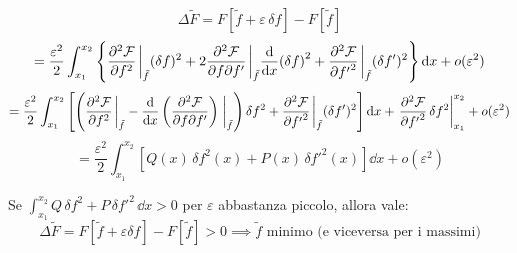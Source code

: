 \begin{equation*}
    \Delta \tilde{F} = F\left[ \tilde{f} + \varepsilon \, \delta f \right] - F[\tilde{f}]   
\end{equation*}
\begin{equation*}
    = \frac{\varepsilon^2}{2} \int_{x_1}^{x_2} \left\{
    \pdv[2]{\mathcal{F}}{f}\eval_{\tilde{f}} (\delta f)^2 
    + 2 \pdv[2]{\mathcal{F}}{f}{{f'}}\eval_{\tilde{f}} \dv{x}(\delta f)^2 
    + \pdv[2]{\mathcal{F}}{{f'}}\eval_{\tilde{f}} (\delta f')^2 
    \right\} \dd{x} + o(\varepsilon^2)
\end{equation*}
\begin{equation*}
    = \frac{\varepsilon^2}{2} \int_{x_1}^{x_2} \left[
    \left( \pdv[2]{\mathcal{F}}{f} \eval_{\tilde{f}}
    - \dv{x} \left( \pdv[2]{\mathcal{F}}{f}{{f'}} \right)\eval_{\tilde{f}}
    \right) \delta f^2+
    \pdv[2]{\mathcal{F}}{{f'}}\eval_{\tilde{f}} (\delta f')^2 \right] \dd{x}
    + \eval{\pdv[2]{\mathcal{F}}{{f'}} \, \delta f^2}_{x_1}^{x_2}
    + o(\varepsilon^2)
\end{equation*}
\begin{equation*}
    = \frac{\varepsilon^2}{2} \int_{x_1}^{x_2}
    \left[ Q(x) \, \delta f^2(x)+ P(x) \, \delta f'^2(x) \right] \dd{x} + o(\varepsilon^2)
\end{equation*}

Se $\int_{x_1}^{x_2} Q\, \delta f^2 + P\, \delta f'^2\, \dd{x} > 0 $ per $\varepsilon$ abbastanza piccolo,
allora vale:
\begin{equation*}
\Delta \tilde{F} = F\left[ \tilde{f} + \varepsilon \delta f \right] - F[\tilde{f}] > 0
\implies \tilde{f} \text{ minimo (e viceversa per i massimi)}
\end{equation*}
